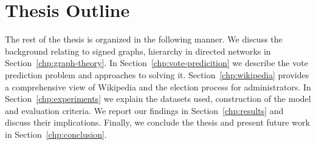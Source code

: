 \section{Thesis Outline}
The rest of the thesis is organized in the following manner. We discuss the background relating to signed graphs, hierarchy in directed networks in Section~\ref{chp:graph-theory}. In Section~\ref{chp:vote-predicition} we describe the vote prediction problem and approaches to solving it. Section~\ref{chp:wikipedia} provides a comprehensive view of Wikipedia and the election process for administrators. In Section~\ref{chp:experiments} we explain the datasets used, construction of the model and evaluation criteria. We report our findings in Section~\ref{chp:results} and discuss their implications. Finally, we conclude the thesis and present future work in Section~\ref{chp:conclusion}.